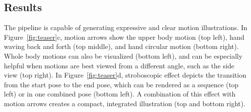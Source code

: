 
\subsection{Results}
The \systemname{} pipeline is capable of generating expressive and clear motion illustrations. In Figure~\ref{fig:teaser}c, motion arrows show the upper body motion (top left), hand waving back and forth (top middle), and hand circular motion (bottom right). Whole body motions can also be visualized (bottom left), and can be especially helpful when motions are best viewed from a different angle, such as the side view (top right).
%
In Figure~\ref{fig:teaser}d, stroboscopic effect depicts the transition from the start pose to the end pose, which can be rendered as a sequence (top left) or in one combined pose (bottom left). A combination of this effect with motion arrows creates a compact, integrated illustration (top and bottom right).




